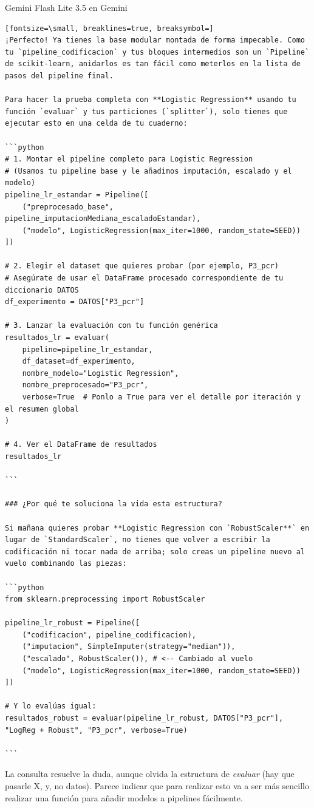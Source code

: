 \documentclass[12pt,a4paper,oneside]{book}
\begin{document}
\begin{iaresp}{Gemini Flash Lite 3.5 en Gemini}
\begin{Verbatim}[fontsize=\small, breaklines=true, breaksymbol=]
¡Perfecto! Ya tienes la base modular montada de forma impecable. Como tu `pipeline_codificacion` y tus bloques intermedios son un `Pipeline` de scikit-learn, anidarlos es tan fácil como meterlos en la lista de pasos del pipeline final.

Para hacer la prueba completa con **Logistic Regression** usando tu función `evaluar` y tus particiones (`splitter`), solo tienes que ejecutar esto en una celda de tu cuaderno:

```python
# 1. Montar el pipeline completo para Logistic Regression
# (Usamos tu pipeline base y le añadimos imputación, escalado y el modelo)
pipeline_lr_estandar = Pipeline([
    ("preprocesado_base", pipeline_imputacionMediana_escaladoEstandar),
    ("modelo", LogisticRegression(max_iter=1000, random_state=SEED))
])

# 2. Elegir el dataset que quieres probar (por ejemplo, P3_pcr)
# Asegúrate de usar el DataFrame procesado correspondiente de tu diccionario DATOS
df_experimento = DATOS["P3_pcr"] 

# 3. Lanzar la evaluación con tu función genérica
resultados_lr = evaluar(
    pipeline=pipeline_lr_estandar, 
    df_dataset=df_experimento, 
    nombre_modelo="Logistic Regression", 
    nombre_preprocesado="P3_pcr", 
    verbose=True  # Ponlo a True para ver el detalle por iteración y el resumen global
)

# 4. Ver el DataFrame de resultados
resultados_lr

```

### ¿Por qué te soluciona la vida esta estructura?

Si mañana quieres probar **Logistic Regression con `RobustScaler**` en lugar de `StandardScaler`, no tienes que volver a escribir la codificación ni tocar nada de arriba; solo creas un pipeline nuevo al vuelo combinando las piezas:

```python
from sklearn.preprocessing import RobustScaler

pipeline_lr_robust = Pipeline([
    ("codificacion", pipeline_codificacion),
    ("imputacion", SimpleImputer(strategy="median")),
    ("escalado", RobustScaler()), # <-- Cambiado al vuelo
    ("modelo", LogisticRegression(max_iter=1000, random_state=SEED))
])

# Y lo evalúas igual:
resultados_robust = evaluar(pipeline_lr_robust, DATOS["P3_pcr"], "LogReg + Robust", "P3_pcr", verbose=True)

```
\end{Verbatim}
\end{iaresp}
\begin{iaanalisis}
La consulta resuelve la duda, aunque olvida la estructura de \textit{evaluar} (hay que pasarle X, y, no datos). Parece indicar que para realizar esto va a ser más sencillo realizar una función para añadir modelos a pipelines fácilmente.
\end{iaanalisis}
\end{document}
